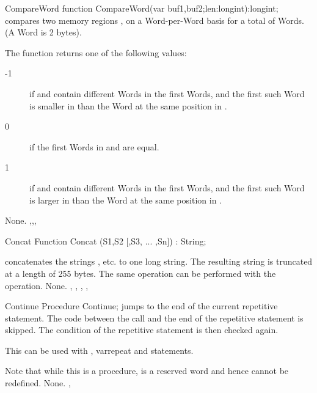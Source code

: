 
\begin{function}{CompareWord}
\Declaration
function  CompareWord(var buf1,buf2;len:longint):longint;
\Description
{} compares two memory regions , on a
Word-per-Word basis for a total of  Words. (A Word is 2 bytes).

The function returns one of the following values:
\begin{description}
\item[-1] if  and  contain different Words
in the first  Words, and the first such Word is smaller in 
than the Word at the same position in .
\item[0]  if the first  Words in  and  are
equal.
\item [1] if  and  contain different Words
in the first  Words, and the first such Word is larger in 
than the Word at the same position in .
\end{description}
\Errors
None.
\SeeAlso
{},,,
\end{function}


\begin{function}{Concat}
\Declaration
Function Concat (S1,S2 [,S3, ... ,Sn]) : String;

\Description
{} concatenates the strings , etc. to one long
string. The resulting string is truncated at a length of 255 bytes.
The same operation can be performed with the \var{+} operation.
\Errors
None.
\SeeAlso
{}, , , , 
\end{function}


\begin{procedure}{Continue}
\Declaration
Procedure Continue;
\Description
{} jumps to the end of the current repetitive statement.
The code between the  call and the end of the repetitive
statement is skipped. The condition of the repetitive statement is then
checked again.

This can be used with , var{repeat} and  statements.

Note that while this is a procedure,  is a reserved word
and hence cannot be redefined.
\Errors
None.
\SeeAlso
{}, 
\end{procedure}

